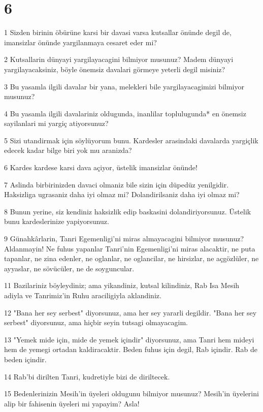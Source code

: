 \chapter{6}

\par 1 Sizden birinin öbürüne karsi bir davasi varsa kutsallar önünde degil de, imansizlar önünde yargilanmaya cesaret eder mi?
\par 2 Kutsallarin dünyayi yargilayacagini bilmiyor musunuz? Madem dünyayi yargilayacaksiniz, böyle önemsiz davalari görmeye yeterli degil misiniz?
\par 3 Bu yasamla ilgili davalar bir yana, melekleri bile yargilayacagimizi bilmiyor musunuz?
\par 4 Bu yasamla ilgili davalariniz oldugunda, inanlilar toplulugunda* en önemsiz sayilanlari mi yargiç atiyorsunuz?
\par 5 Sizi utandirmak için söylüyorum bunu. Kardesler arasindaki davalarda yargiçlik edecek kadar bilge biri yok mu aranizda?
\par 6 Kardes kardese karsi dava açiyor, üstelik imansizlar önünde!
\par 7 Aslinda birbirinizden davaci olmaniz bile sizin için düpedüz yenilgidir. Haksizliga ugrasaniz daha iyi olmaz mi? Dolandirilsaniz daha iyi olmaz mi?
\par 8 Bunun yerine, siz kendiniz haksizlik edip baskasini dolandiriyorsunuz. Üstelik bunu kardeslerinize yapiyorsunuz.
\par 9 Günahkârlarin, Tanri Egemenligi'ni miras almayacagini bilmiyor musunuz? Aldanmayin! Ne fuhus yapanlar Tanri'nin Egemenligi'ni miras alacaktir, ne puta tapanlar, ne zina edenler, ne oglanlar, ne oglancilar, ne hirsizlar, ne açgözlüler, ne ayyaslar, ne sövücüler, ne de soyguncular.
\par 11 Bazilariniz böyleydiniz; ama yikandiniz, kutsal kilindiniz, Rab Isa Mesih adiyla ve Tanrimiz'in Ruhu araciligiyla aklandiniz.
\par 12 "Bana her sey serbest" diyorsunuz, ama her sey yararli degildir. "Bana her sey serbest" diyorsunuz, ama hiçbir seyin tutsagi olmayacagim.
\par 13 "Yemek mide için, mide de yemek içindir" diyorsunuz, ama Tanri hem mideyi hem de yemegi ortadan kaldiracaktir. Beden fuhus için degil, Rab içindir. Rab de beden içindir.
\par 14 Rab'bi dirilten Tanri, kudretiyle bizi de diriltecek.
\par 15 Bedenlerinizin Mesih'in üyeleri oldugunu bilmiyor musunuz? Mesih'in üyelerini alip bir fahisenin üyeleri mi yapayim? Asla!
